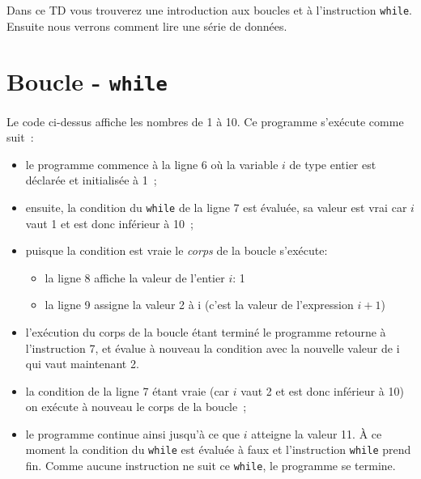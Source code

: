 \documentclass[a4paper,11pt]{article}
\date{2018 -- 2019}
\begin{document}
\entete
\titre
{}
\lastedit


	Dans ce TD vous trouverez une introduction aux boucles et à l'instruction \texttt{while}.
	Ensuite nous verrons comment lire une série de données.
	 
	\tableofcontents

	\newpage

\section{Boucle - \texttt{while}}

	Le code ci-dessus affiche les nombres de 1 à 10.
	Ce programme s'exécute comme suit~:
	\begin{itemize}
		\item  le programme commence à la ligne 6 où la variable $i$ de type entier est déclarée et initialisée à 1~;
		\item  ensuite, la condition du \texttt{while} de la ligne 7 est évaluée, sa valeur est vrai car $i$ vaut 1 et est donc inférieur à 10~;
		\item puisque la condition est vraie le \emph{corps} de la boucle s'exécute:
			\begin{itemize}
				\item la ligne 8 affiche la valeur de l'entier $i$: 1
				\item la ligne 9 assigne la valeur 2 à i (c'est la valeur de l'expression $i+1$)
			\end{itemize}
		\item l'exécution du corps de la boucle étant terminé le programme retourne à l'instruction 7, 
			et évalue à nouveau la condition avec la nouvelle valeur de i qui vaut maintenant 2.
		\item  la condition de la ligne 7 étant vraie (car $i$ vaut 2 et est donc inférieur à 10) on exécute à nouveau le corps de la boucle~;
		\item le programme continue ainsi jusqu'à ce que $i$ atteigne la valeur 11. 
			\`A ce moment la condition du \texttt{while} est évaluée à faux et l'instruction 
			\texttt{while} prend fin.
			Comme aucune instruction ne suit ce \texttt{while}, le programme se termine.
	\end{itemize}
\end{document}
